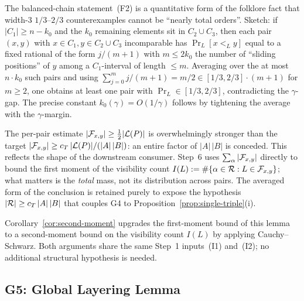 \begin{remark}
The balanced-chain statement~(F2) is a quantitative form of the
folklore fact that width-$3$ $1/3$--$2/3$ counterexamples cannot be
``nearly total orders''. Sketch: if $|C_1| \ge n - k_0$ and the
$k_0$ remaining elements sit in $C_2 \cup C_3$, then each pair
$(x,y)$ with $x \in C_1, y \in C_2 \cup C_3$ incomparable has
$\Pr_L[x<_L y]$ equal to a fixed rational of the form $j/(m+1)$
with $m \le 2k_0$ the number of ``sliding positions'' of $y$ among a
$C_1$-interval of length $\le m$. Averaging over the at most
$n\cdot k_0$ such pairs and using $\sum_{j=0}^m j/(m+1) = m/2 \in
[1/3,2/3]\cdot(m+1)$ for $m \ge 2$, one obtains at least one pair
with $\Pr_L \in [1/3,2/3]$, contradicting the $\gamma$-gap. The
precise constant $k_0(\gamma) = O(1/\gamma)$ follows by tightening
the average with the $\gamma$-margin.
\end{remark}

\begin{remark}\label{rem:G4-loose}
The per-pair estimate $|\mathcal{F}_{x,y}| \ge \tfrac12|\mathcal{L}(P)|$ is overwhelmingly
stronger than the target $|\mathcal{F}_{x,y}| \ge c_T\,|\mathcal{L}(P)|/(|A|\,|B|)$: an entire
factor of $|A|\,|B|$ is conceded. This reflects the shape of the
downstream consumer. Step~6 uses $\sum_\alpha |\mathcal{F}_{x,y}|$ directly to bound
the first moment of the visibility count
$I(L) := \#\{\alpha \in \mathcal{R} : L \in \mathcal{F}_{x,y}\}$; what matters is the
\emph{total} mass, not its distribution across pairs. The averaged form
of the conclusion is retained purely to expose the hypothesis
$|\mathcal{R}| \ge c_T\,|A|\,|B|$ that couples G4 to
Proposition~\ref{prop:single-triple}(i).
\end{remark}

\begin{remark}
Corollary~\ref{cor:second-moment} upgrades the first-moment bound of
this lemma to a second-moment bound on the visibility count $I(L)$ by
applying Cauchy--Schwarz. Both arguments share the same Step~1
inputs~(I1) and~(I2); no additional structural hypothesis is needed.
\end{remark}

\subsection{G5: Global Layering Lemma}\label{subsec:G5}

